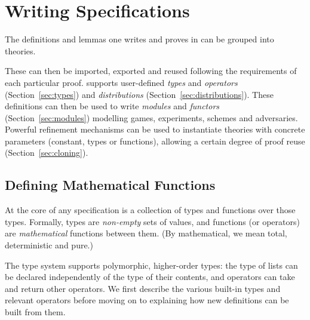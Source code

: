 
\chapter{Writing Specifications\label{chap:theories}}
The definitions and lemmas one writes and proves in \EasyCrypt can be grouped
into theories.

These can then be imported, exported and reused following the
requirements of each particular proof. \EasyCrypt supports user-defined
\emph{types} and \emph{operators} (Section~\ref{sec:types}) and
\emph{distributions} (Section~\ref{sec:distributions}). These definitions can
then be used to write \emph{modules} and \emph{functors}
(Section~\ref{sec:modules}) modelling games, experiments, schemes and
adversaries. Powerful refinement mechanisms can be used to instantiate theories
with concrete parameters (constant, types or functions), allowing a certain
degree of proof reuse (Section~\ref{sec:cloning}).


\section{Defining Mathematical Functions\label{sec:types}}
At the core of any \EasyCrypt specification is a collection of types and functions
over those types. Formally, \EasyCrypt types are \emph{non-empty} sets of
values, and functions (or operators) are \emph{mathematical} functions between
them. (By mathematical, we mean total, deterministic and pure.)

The \EasyCrypt type system supports polymorphic, higher-order types: the type of
lists can be declared independently of the type of their contents, and operators
can take and return other operators. We first describe the various built-in
types and relevant operators before moving on to explaining how new definitions
can be built from them.


